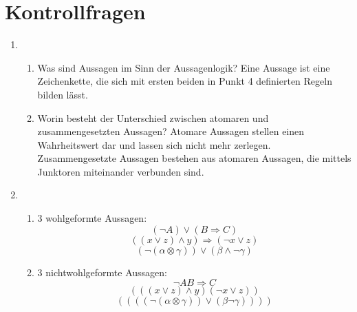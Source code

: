 \documentclass[a4paper]{article}
\begin{document}
	\section{Kontrollfragen}

	\begin{enumerate}
		\item
		\begin{enumerate}
			\item Was sind Aussagen im Sinn der Aussagenlogik?
			\newline
			Eine Aussage ist eine Zeichenkette, die sich mit ersten beiden in Punkt 4 definierten Regeln bilden lässt.
			
			\item Worin besteht der Unterschied zwischen atomaren und zusammengesetzten Aussagen?
			\newline
			Atomare Aussagen stellen einen Wahrheitswert dar und lassen sich nicht mehr zerlegen.
			Zusammengesetzte Aussagen bestehen aus atomaren Aussagen, die mittels Junktoren miteinander verbunden sind.
		\end{enumerate}
		
		\item
		\begin{enumerate}
			\item 3 wohlgeformte Aussagen:
			\begin{equation*}
				(\lnot A) \lor (B \Rightarrow C)
			\end{equation*}
			\begin{equation*}
				((x \lor z) \land y) \Rightarrow (\lnot x \lor z)
			\end{equation*}
			\begin{equation*}
				(\lnot(\alpha \otimes \gamma)) \lor (\beta \land \lnot\gamma)
			\end{equation*}
			
			\item 3 nichtwohlgeformte Aussagen:
			\begin{equation*}
				\lnot A B \Rightarrow C
			\end{equation*}
			\begin{equation*}
				(((x \lor z) \land y)(\lnot x \lor z))
			\end{equation*}
			\begin{equation*}
				((((\lnot(\alpha \otimes \gamma)) \lor (\beta \lnot\gamma))))
			\end{equation*}
			
		\end{enumerate}
		

\end{enumerate}
\end{document}
